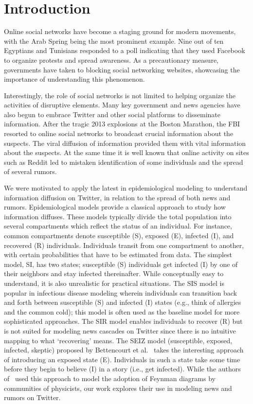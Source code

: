\section{Introduction}
Online social networks have become a staging ground for modern
movements, with the Arab Spring being the most prominent example.
Nine out of ten Egyptians and Tunisians responded to a poll indicating
that they used Facebook to organize protests and spread awareness.
As a precautionary measure, governments have taken to
blocking social networking websites, showcasing the importance of understanding
this phenomenon.

Interestingly, the role of social networks is not limited to
helping organize the activities of disruptive elements.
Many key government and news
agencies have also begun to embrace Twitter and other social platforms
to disseminate information.
After the tragic 2013 explosions at the Boston Marathon, the
FBI resorted to online social networks to broadcast crucial information
about the suspects. The viral diffusion of information provided them with
vital information about the suspects.
At the same time it is well known
that online activity on sites
such as Reddit led to mistaken identification of some individuals
and the spread of several rumors.

We were motivated to apply the latest in epidemiological modeling to understand
information diffusion on Twitter, in relation to the spread
of both news and rumors.
Epidemiological models provide
a classical approach to study how information diffuses.
These models typically divide the total population into several compartments
which reflect the status of an individual. For instance, common compartments
denote susceptible (S), exposed (E), infected (I), and
recovered (R) individuals. Individuals transit from one compartment to another, with
certain probabilities that have to be estimated from data.
The simplest model, SI, has two states; susceptible (S) individuals get infected (I) by one of their neighbors
and stay infected thereinafter. While conceptually easy to understand,
it is also unrealistic
for practical situations. The SIS model is
popular in infectious disease modeling wherein individuals can transition back
and forth between
susceptible (S) and infected (I) states (e.g., think of allergies and
the common cold); this model is often used as the
baseline model for more sophisticated approaches. The SIR model
enables individuals to
recover (R) but is not suited for modeling news cascades on Twitter since there
is no intuitive mapping to what `recovering' means.
The SEIZ
model (susceptible, exposed, infected, skeptic) proposed by Bettencourt et al.~\cite{powerofgoodidea:2006}
takes the interesting approach of introducing an exposed state (E).
Individuals in such a state take some time before they begin to believe (I)
in a story (i.e., get infected). While the authors
of~\cite{powerofgoodidea:2006}
used this approach to model the adoption of Feynman
diagrams by communities of physicists, our work explores their use in
modeling news and rumors on Twitter.

